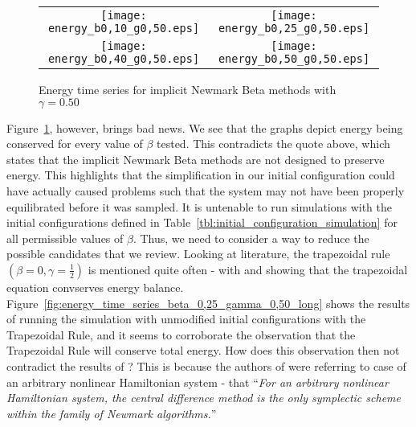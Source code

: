 \documentclass[../Main.tex]{subfiles}
\begin{document}
\begin{figure}[H]
\centering
 	\begin{tabular}{@{}cc@{}}
    		\texttt{[image: energy\_b0,10\_g0,50.eps]} &
    		\texttt{[image: energy\_b0,25\_g0,50.eps]} \\
    		\texttt{[image: energy\_b0,40\_g0,50.eps]} &
    		\texttt{[image: energy\_b0,50\_g0,50.eps]} \\
	\end{tabular}
  	\caption{Energy time series for implicit Newmark Beta methods with $\gamma = 0.50$}
	\label{fig:energy_time_series_gamma_0,50_implicit_beta}
\end{figure} 

Figure~\ref{fig:energy_time_series_gamma_0,50_implicit_beta}, however, brings bad news. We see that the graphs depict energy being conserved for every value of $\beta$ tested. This contradicts the quote above, which states that the implicit Newmark Beta methods are not designed to preserve energy. This highlights that the simplification in our initial configuration could have actually caused problems such that the system may not have been properly equilibrated before it was sampled. It is untenable to run simulations with the initial configurations defined in Table~\ref{tbl:initial_configuration_simulation} for all permissible values of $\beta$.
Thus, we need to consider a way to reduce the possible candidates that we review. Looking at literature, the trapezoidal rule $\left(\beta = 0, \gamma = \frac{1}{2}\right)$ is mentioned quite often - with \cite{DoyenErnPiperno2011} and \cite{Krenk2005} showing that the trapezoidal equation convserves energy balance. Figure~\ref{fig:energy_time_series_beta_0,25_gamma_0,50_long} shows the results of running the simulation with unmodified initial configurations with the Trapezoidal Rule, and it seems to corroborate the observation that the Trapezoidal Rule will conserve total energy. How does this observation then not contradict the results of \cite{SimoTarnowWong1992}? This is because the authors of  \cite{SimoTarnowWong1992} were referring to case of an arbitrary nonlinear Hamiltonian system - that ``\textit{For an arbitrary nonlinear Hamiltonian system, the central difference method is the only symplectic scheme within the family of Newmark algorithms.}''
\end{document}
